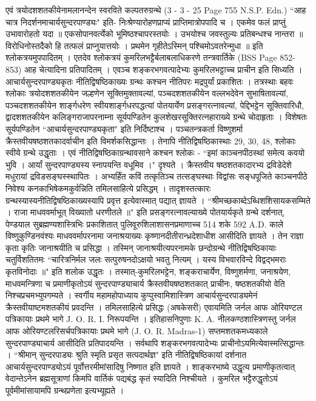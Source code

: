 एवं त्रयोदशशतकीयेनामलानन्देन स्वरविते कल्पतरुग्रन्थे (3 - 3 - 25 Page 755 N.S.P. Edn.) ``आह चात्र निदर्शनमाचार्यसुन्दरपाण्ड्यः" इति-
निःश्रेण्यारोहणप्राप्यं प्राप्तिमात्रोपपादि च ।
एकमेव फलं प्राप्तुं उभावारोहतो यदा ॥
एकसोपानवर्त्येको भूमिष्ठश्चापरस्तयोः ।
उभयोश्च जवस्तुल्यः प्रतिबन्धश्च नान्तरा ॥
विरोधिनोस्तदैको हि तत्फलं प्राप्नुयात्तयोः ।
प्रथमेन गृहीतेऽस्मिन् पश्चिमोऽवतरेन्मुधा ॥ इति 
श्लोकत्रयमुपपादितम् । एतदेव श्लोकत्रयं कुमरिलभट्टैर्बलाबलाधिकरणे तन्त्रवार्तिके (BSS Page 852-853) आह चेत्यादिना प्रतिपादितम् । एवञ्च शङ्करभगवत्पादेभ्यः कुमरिलभट्टाच्च प्राचीन इति सिध्यति ।
आचार्यसुन्दरपाण्ड्यकृतः नीतिद्विषष्ठिकाख्यः ग्रन्थः कश्चन नीतिपरः मद्रपुर्यां प्रकाशितः । तत्रस्थाः बहवः श्लोकाः त्रयोदशशतकीयेन जल्हणेन सूक्तिमुक्तावल्यां, पञ्चदशशतकीयेन वल्लभदेवेन सुभाषितावल्यां, पञ्चदशशतकीयेन शार्ङ्गधरेण स्वीयशार्ङ्गधरपद्धत्यां पोतयार्येण प्रसङ्गरत्नावल्यां, पेद्दिभट्टेन सूक्तिवारिधौ, द्वादशशतकीयेन कलिङ्गराजापरनाम्ना सूर्यपण्डितेन कुलशेखरसूक्तिरत्नहाराख्ये ग्रन्थे चोदाहृताः । विशेषतः सूर्यपण्डितेन ``आचार्यसुन्दरपाण्ड्यकृता" इति निर्दिष्टाश्च । पञ्चतन्त्रकर्ता विष्णुशर्मा क्रैस्तवीयषष्ठशतकादर्वाचीन इति विमर्शकसिद्धान्तः । तेनापि नीतिद्विषष्ठिकास्थाः 29, 30, 48, श्लोकाः स्वीये ग्रन्थे उद्धृताः । एवं नीतिद्विषष्ठिकाग्रन्थावसाने कश्चन श्लोकः - ``इमां काञ्चनपीठस्थां समेत्य कवयो भुवि । आर्यां सुन्दरपाण्ड्यस्य स्नापयन्ति वधूमिव ।" दृश्यते । क्रैस्तवीय षष्ठशतकादारभ्य द्रविडेदेशे मधुरायां द्रविडसङ्घस्स्थापितः । अभ्यर्हिंत कविं तत्कृतिञ्च तत्सङ्घस्थाः विद्वांसः सङ्धपूजिते काञ्चनपीठे निवेश्य कनकाभिषेकमकुर्वन्निति तमिलसाहित्ये प्रसिद्धम् । तादृशस्तत्कारः ग्रन्थस्यास्यनीतिद्विषष्ठिकाख्यस्यापि प्रवृत्त इत्येवास्मात् पद्यात् ज्ञायते ।
``श्रीमच्छकाब्देऽब्धिशशिसायकसम्मिते । राजा माधववर्माभूत् विख्यातो धरणीतले ॥" इति प्रसङ्गरत्नावल्याख्ये पोतयार्यकृते ग्रन्थे दर्शनात्, पेण्डयाल सुब्रह्मण्यशास्त्रिभिः प्रकाशितात् पुलिवूरुशिलाशासनप्रमाणाच्च 514 शके 592 A.D. काले विष्णुकुण्डिनवंश्यः माधववर्मापरनामा जनाश्रयाख्यः कृष्णानदीतीरान्ध्रदेशाधीश आसीदिति ज्ञायते । तेन राज्ञा कृता कृतिः जानाश्रयीति च प्रसिद्धा । तस्मिन् जानाश्रयीत्यपरनामके छन्दोग्रन्थे नीतिद्विषष्ठिकायाः चतुर्विशतितमः ``चारित्रनिर्मल जलः सत्पुरुषनदोऽक्षयो भवतु नित्यम् । यस्य विभवारविन्दे विद्वद्भमराः कृतविनोदाः ॥" इति शलोक उद्धृतः ।
तस्मात्-कुमरिलभट्टेन, शङ्कराचार्येण, विष्णुशर्मणा, जनाश्रयेण, माधवमन्त्रिणा च प्रमाणीकृतोऽयं सुन्दरपाण्ड्याचार्य क्रैस्तवीयषष्ठशतकात् प्राचीनः, षष्ठशतकीयो वेति निश्चप्रचमभ्युपगम्यते ।
स्वर्गीय महामहोपाध्याय कुप्पुस्वामिशास्त्रिण आचार्यसुन्दरपाड्यमेनं क्रैस्तवीयाष्टमशतकीयं प्रवदन्ति । तमिलसाहित्ये प्रसिद्धः (अषकेसरी) एवायमिति जर्नल आफ ओरियण्टल पत्रिकायाः प्रथमे भागे J. O. R. I. निरूपयन्ति । इतिहासनिपुणाः K. A. नीलकण्ठशास्त्रिणस्तु जर्नल आफ ओरियण्टलरिसर्चपत्रिकायाः प्रथमे भागे (J. O. R. Madras-1) सप्तमशतकमध्यकाले सुन्दरपाण्ड्याचार्य आसीदिति प्रतिपादयन्ति । सर्वथापि शङ्करभगवत्पादेभ्यः प्राचीनोऽयमित्येवास्मत्सिद्धान्तः । ``श्रीमान् सुन्दरपाड्यः श्रुति स्मृति प्रसृत सत्पदार्थज्ञ" इति नीतिद्विषष्ठिकायां दर्शनात आचार्यसुन्दरपाण्ड्योऽयं पूर्वोत्तरमीमांसादिषु निष्णात इति ज्ञायते । शाङ्करभाष्ये उद्धृत्य प्रमाणीकृतत्वात् वेदान्तेऽनेन ब्रह्मसूत्राणां किमपि वार्तिकं पद्यबंद्ध कृतं स्यादिति निश्चीयते । कुमरिल भट्टैरुद्धृतोऽयं पूर्वमीमांसायामपि ग्रन्थप्रणेता इत्यभ्यूह्यते ।
